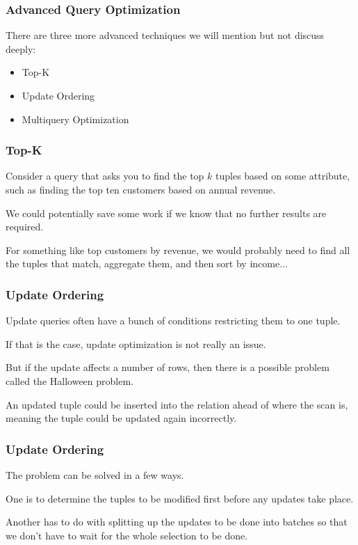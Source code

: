 \begin{frame}
\frametitle{Advanced Query Optimization}

There are three more advanced techniques we will mention but not discuss deeply:

\begin{itemize}
	\item Top-K
	\item Update Ordering
	\item Multiquery Optimization
\end{itemize}


\end{frame}

\begin{frame}
\frametitle{Top-K}

Consider a query that asks you to find the top $k$ tuples based on some attribute, such as finding the top ten customers based on annual revenue. 

We could potentially save some work if we know that no further results are required.

For something like top customers by revenue, we would probably need to find all the tuples that match, aggregate them, and then sort by income...

\end{frame}


\begin{frame}
\frametitle{Update Ordering}

Update queries often have a bunch of conditions restricting them to one tuple. 

If that is the case, update optimization is not really an issue. 

But if the update affects a number of rows, then there is a possible problem called the \alert{Halloween problem}.

An updated tuple could be inserted into the relation ahead of where the scan is, meaning the tuple could be updated again incorrectly. 

\end{frame}

\begin{frame}
\frametitle{Update Ordering}

The problem can be solved in a few ways. 

One is to determine the tuples to be modified first before any updates take place. 

Another has to do with splitting up the updates to be done into batches so that we don't have to wait for the whole selection to be done.


\end{frame}


